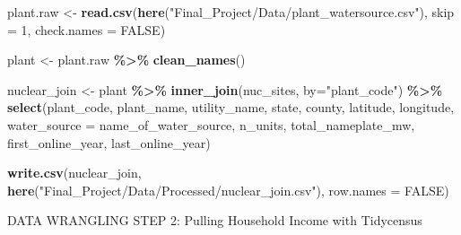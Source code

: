 \documentclass[
]{article}
\newenvironment{Shaded}{\begin{snugshade}}{\end{snugshade}}
\newcommand{\AttributeTok}[1]{\textcolor[rgb]{0.13,0.29,0.53}{#1}}
\newcommand{\ConstantTok}[1]{\textcolor[rgb]{0.56,0.35,0.01}{#1}}
\newcommand{\DecValTok}[1]{\textcolor[rgb]{0.00,0.00,0.81}{#1}}
\newcommand{\FunctionTok}[1]{\textcolor[rgb]{0.13,0.29,0.53}{\textbf{#1}}}
\newcommand{\NormalTok}[1]{#1}
\newcommand{\OtherTok}[1]{\textcolor[rgb]{0.56,0.35,0.01}{#1}}
\newcommand{\SpecialCharTok}[1]{\textcolor[rgb]{0.81,0.36,0.00}{\textbf{#1}}}
\newcommand{\StringTok}[1]{\textcolor[rgb]{0.31,0.60,0.02}{#1}}
\begin{document}
\begin{Shaded}
\begin{Highlighting}[]
\NormalTok{plant.raw }\OtherTok{\textless{}{-}} \FunctionTok{read.csv}\NormalTok{(}\FunctionTok{here}\NormalTok{(}\StringTok{"Final\_Project/Data/plant\_watersource.csv"}\NormalTok{), }\AttributeTok{skip =} \DecValTok{1}\NormalTok{, }\AttributeTok{check.names =} \ConstantTok{FALSE}\NormalTok{)}

\NormalTok{plant }\OtherTok{\textless{}{-}}\NormalTok{ plant.raw }\SpecialCharTok{\%\textgreater{}\%} \FunctionTok{clean\_names}\NormalTok{()}
\end{Highlighting}
\end{Shaded}

\begin{Shaded}
\begin{Highlighting}[]
\NormalTok{nuclear\_join }\OtherTok{\textless{}{-}}\NormalTok{ plant }\SpecialCharTok{\%\textgreater{}\%}  
  \FunctionTok{inner\_join}\NormalTok{(nuc\_sites, }\AttributeTok{by=}\StringTok{"plant\_code"}\NormalTok{) }\SpecialCharTok{\%\textgreater{}\%}  
  \FunctionTok{select}\NormalTok{(plant\_code, plant\_name, utility\_name, state, county,}
\NormalTok{         latitude, longitude, }\AttributeTok{water\_source =}\NormalTok{ name\_of\_water\_source,}
\NormalTok{         n\_units, total\_nameplate\_mw,}
\NormalTok{         first\_online\_year, last\_online\_year)}

\FunctionTok{write.csv}\NormalTok{(nuclear\_join, }
          \FunctionTok{here}\NormalTok{(}\StringTok{"Final\_Project/Data/Processed/nuclear\_join.csv"}\NormalTok{), }
          \AttributeTok{row.names =} \ConstantTok{FALSE}\NormalTok{)}
\end{Highlighting}
\end{Shaded}

DATA WRANGLING STEP 2: Pulling Household Income with Tidycensus
\end{document}
